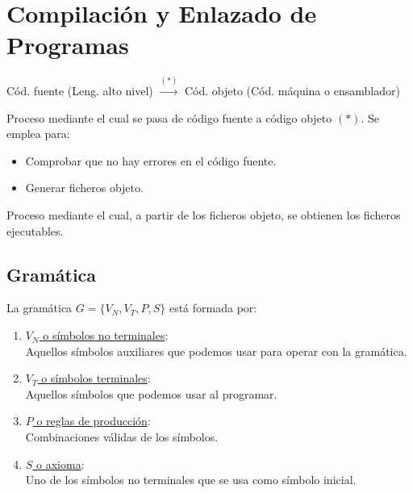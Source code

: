 \chapter{Compilación y Enlazado de Programas}

\begin{center}
    Cód. fuente (Leng. alto nivel) $\xrightarrow{(*)}$
    Cód. objeto (Cód. máquina o ensamblador)
\end{center}

\begin{definicion} [Compilación] Proceso mediante el cual se pasa de código fuente a código objeto $(*)$. Se emplea para:
    \begin{itemize}
        \item Comprobar que no hay errores en el código fuente.
        \item Generar ficheros objeto.
    \end{itemize}
\end{definicion}

\begin{definicion}[Enlazado]
    Proceso mediante el cual, a partir de los ficheros objeto, se obtienen los ficheros ejecutables.
\end{definicion}
\section{Gramática}
\begin{definicion} [Gramática]
    La gramática $G=\{V_N, V_T, P, S\}$ está formada por:
    \begin{enumerate}
        \item \underline{$V_N$ o símbolos no terminales}:\\
        Aquellos símbolos auxiliares que podemos usar para operar con la gramática.

        \item \underline{$V_T$ o símbolos terminales}:\\
        Aquellos símbolos que podemos usar al programar.

        \item \underline{$P$ o reglas de producción}:\\
        Combinaciones válidas de los símbolos.

        \item \underline{$S$ o axioma}:\\
        Uno de los símbolos no terminales que se usa como símbolo inicial.
    \end{enumerate}
\end{definicion}

